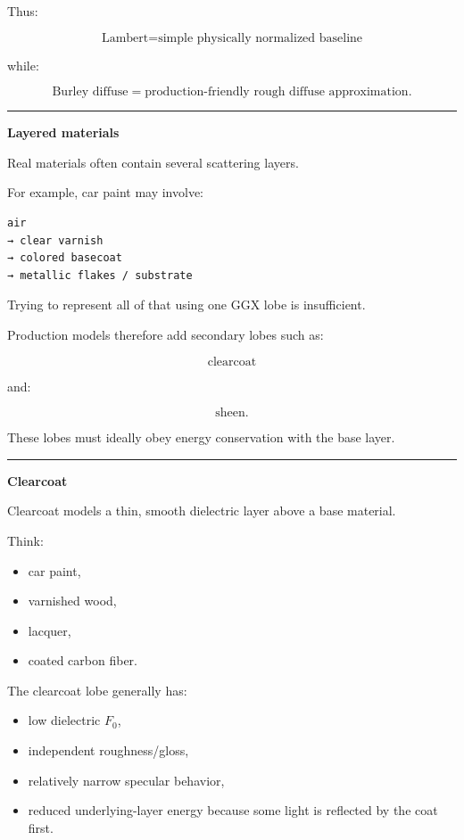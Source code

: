 Thus:

\[
\boxed{
\text{Lambert}
=
\text{simple physically normalized baseline}
}
\]

while:

\[
\boxed{
\text{Burley diffuse}
=
\text{production-friendly rough diffuse approximation}.
}
\]

\begin{center}\rule{0.5\linewidth}{0.5pt}\end{center}

\textbf{Layered materials}

Real materials often contain several scattering layers.

For example, car paint may involve:

\begin{verbatim}
air
→ clear varnish
→ colored basecoat
→ metallic flakes / substrate
\end{verbatim}

Trying to represent all of that using one GGX lobe is insufficient.

Production models therefore add secondary lobes such as:

\[
\text{clearcoat}
\]

and:

\[
\text{sheen}.
\]

These lobes must ideally obey energy conservation with the base layer.

\begin{center}\rule{0.5\linewidth}{0.5pt}\end{center}

\textbf{Clearcoat}

Clearcoat models a thin, smooth dielectric layer above a base material.

Think:

\begin{itemize}
\tightlist
\item
  car paint,
\item
  varnished wood,
\item
  lacquer,
\item
  coated carbon fiber.
\end{itemize}

The clearcoat lobe generally has:

\begin{itemize}
\tightlist
\item
  low dielectric \(F_0\),
\item
  independent roughness/gloss,
\item
  relatively narrow specular behavior,
\item
  reduced underlying-layer energy because some light is reflected by the coat first.
\end{itemize}

